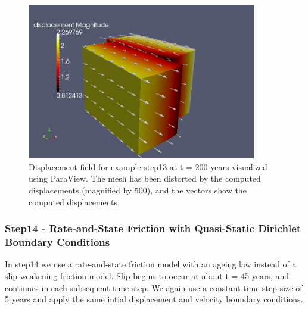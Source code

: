 \begin{figure}
\begin{centering}
\includegraphics[width=10cm]{tutorials/3dhex8/figs/step13-displ-t200}
\par\end{centering}

\caption{Displacement field for example step13 at t = 200 years visualized
using ParaView. The mesh has been distorted by the computed displacements
(magnified by 500), and the vectors show the computed displacements.\label{fig:step13-displ-t200}}
\end{figure}



\subsubsection{Step14 - Rate-and-State Friction with Quasi-Static Dirichlet Boundary
Conditions}

In step14 we use a rate-and-state friction model with an ageing law
instead of a slip-weakening friction model. Slip begins to occur at
about t = 45 years, and continues in each subsequent time step. We
again use a constant time step size of 5 years and apply the same
intial displacement and velocity boundary conditions.

